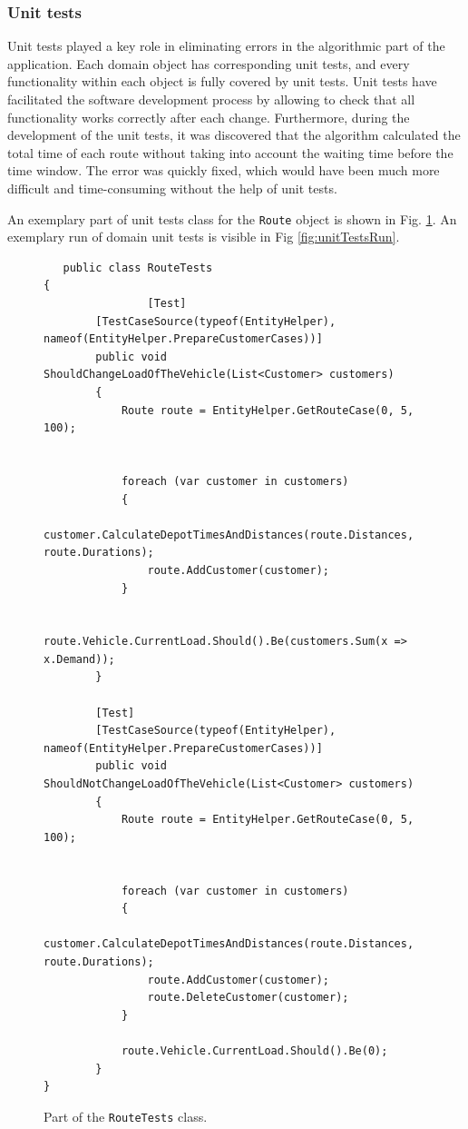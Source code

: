 \documentclass[a4paper,twoside,12pt]{book}
\begin{document}
\subsubsection{Unit tests}
Unit tests played a key role in eliminating errors in the algorithmic part of the application. Each domain object has corresponding unit tests, and every functionality within each object is fully covered by unit tests. Unit tests have facilitated the software development process by allowing to check that all functionality works correctly after each change. Furthermore, during the development of the unit tests, it was discovered that the algorithm calculated the total time of each route without taking into account the waiting time before the time window. The error was quickly fixed, which would have been much more difficult and time-consuming without the help of unit tests.

An exemplary part of unit tests class for the \lstinline|Route| object is shown in Fig. \ref{fig:routeUnitTests}.
An exemplary run of domain unit tests is visible in Fig \ref{fig:unitTestsRun}.

\begin{figure}
\centering
\begin{lstlisting}
   public class RouteTests
{
                [Test]
        [TestCaseSource(typeof(EntityHelper), nameof(EntityHelper.PrepareCustomerCases))]
        public void ShouldChangeLoadOfTheVehicle(List<Customer> customers)
        {
            Route route = EntityHelper.GetRouteCase(0, 5, 100);


            foreach (var customer in customers)
            {
                customer.CalculateDepotTimesAndDistances(route.Distances, route.Durations);
                route.AddCustomer(customer);
            }

            route.Vehicle.CurrentLoad.Should().Be(customers.Sum(x => x.Demand));
        }

        [Test]
        [TestCaseSource(typeof(EntityHelper), nameof(EntityHelper.PrepareCustomerCases))]
        public void ShouldNotChangeLoadOfTheVehicle(List<Customer> customers)
        {
            Route route = EntityHelper.GetRouteCase(0, 5, 100);


            foreach (var customer in customers)
            {
                customer.CalculateDepotTimesAndDistances(route.Distances, route.Durations);
                route.AddCustomer(customer);
                route.DeleteCustomer(customer);
            }

            route.Vehicle.CurrentLoad.Should().Be(0);
        }
}

\end{lstlisting}
\caption{Part of the \lstinline|RouteTests| class.}
\label{fig:routeUnitTests}
\end{figure}
\end{document}

